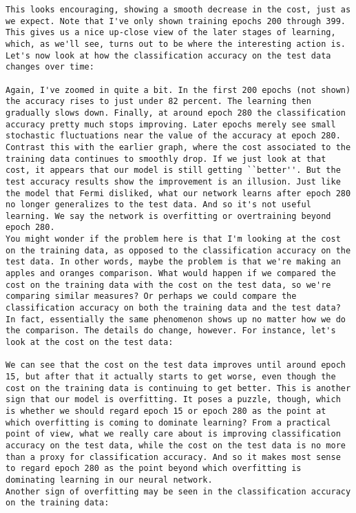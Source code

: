 \begin{lstlisting}
This looks encouraging, showing a smooth decrease in the cost, just as we expect. Note that I've only shown training epochs 200 through 399. This gives us a nice up-close view of the later stages of learning, which, as we'll see, turns out to be where the interesting action is.
Let's now look at how the classification accuracy on the test data changes over time:

Again, I've zoomed in quite a bit. In the first 200 epochs (not shown) the accuracy rises to just under 82 percent. The learning then gradually slows down. Finally, at around epoch 280 the classification accuracy pretty much stops improving. Later epochs merely see small stochastic fluctuations near the value of the accuracy at epoch 280. Contrast this with the earlier graph, where the cost associated to the training data continues to smoothly drop. If we just look at that cost, it appears that our model is still getting ``better''. But the test accuracy results show the improvement is an illusion. Just like the model that Fermi disliked, what our network learns after epoch 280 no longer generalizes to the test data. And so it's not useful learning. We say the network is overfitting or overtraining beyond epoch 280.
You might wonder if the problem here is that I'm looking at the cost on the training data, as opposed to the classification accuracy on the test data. In other words, maybe the problem is that we're making an apples and oranges comparison. What would happen if we compared the cost on the training data with the cost on the test data, so we're comparing similar measures? Or perhaps we could compare the classification accuracy on both the training data and the test data? In fact, essentially the same phenomenon shows up no matter how we do the comparison. The details do change, however. For instance, let's look at the cost on the test data:

We can see that the cost on the test data improves until around epoch 15, but after that it actually starts to get worse, even though the cost on the training data is continuing to get better. This is another sign that our model is overfitting. It poses a puzzle, though, which is whether we should regard epoch 15 or epoch 280 as the point at which overfitting is coming to dominate learning? From a practical point of view, what we really care about is improving classification accuracy on the test data, while the cost on the test data is no more than a proxy for classification accuracy. And so it makes most sense to regard epoch 280 as the point beyond which overfitting is dominating learning in our neural network.
Another sign of overfitting may be seen in the classification accuracy on the training data:


\end{lstlisting}
